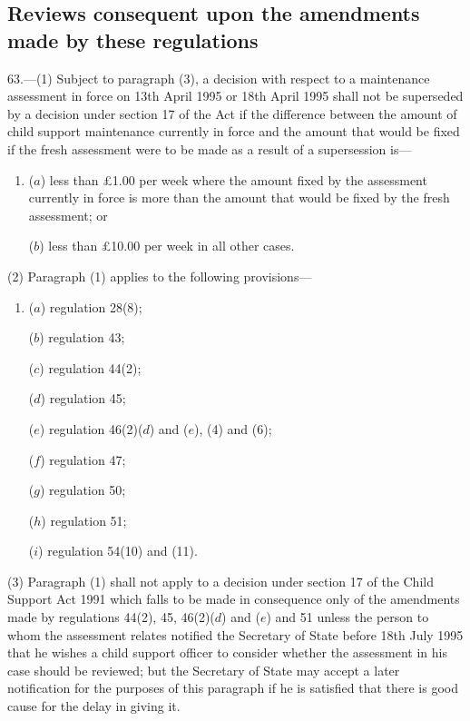 \documentclass[12pt,a4paper]{article}
\begin{document}
\subsection[63. Reviews consequent upon the amendments made by these regulations]{Reviews consequent upon the amendments made by these regulations}

63.—(1) 
Subject to paragraph (3), a decision with respect to a maintenance assessment in force on 13th April 1995 or 18th April 1995 shall not be superseded by a decision under section 17 of the Act if the difference between the amount of child support maintenance currently in force and the amount that would be fixed if the fresh assessment were to be made as a result of a supersession is—  %
\begin{enumerate}\item[]
($a$) less than £1.00 per week where the amount fixed by the assessment currently in force is more than the amount that would be fixed by the fresh assessment; or

($b$) less than £10.00 per week in all other cases.
\end{enumerate}

(2) Paragraph (1) applies to the following provisions—
\begin{enumerate}\item[]
($a$) regulation 28(8);

($b$) regulation 43;

($c$) regulation 44(2);

($d$) regulation 45;

($e$) regulation 46(2)($d$) and ($e$), (4) and (6);

($f$) regulation 47;

($g$) regulation 50;

($h$) regulation 51;

($i$) regulation 54(10) and (11).
\end{enumerate}

(3) Paragraph (1) shall not apply to a 
decision under section 17 of the Child Support Act 1991 which falls to be made  %
in consequence only of the amendments made by regulations 44(2), 45, 46(2)($d$) and ($e$) and 51 unless the person to whom the assessment relates 
notified  %
the Secretary of State before 18th July 1995 that he wishes a child support officer to consider whether the assessment in his case should be reviewed; but the Secretary of State may accept a later notification for the purposes of this paragraph if he is satisfied that there is good cause for the delay in giving it.
\end{document}

